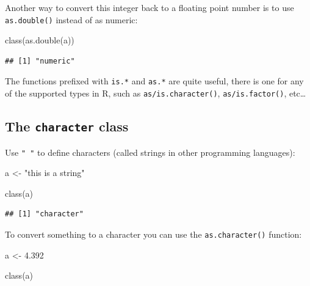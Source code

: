 \documentclass[
]{article}
\newenvironment{Shaded}{\begin{snugshade}}{\end{snugshade}}
\newcommand{\FloatTok}[1]{\textcolor[rgb]{0.00,0.00,0.81}{#1}}
\newcommand{\FunctionTok}[1]{\textcolor[rgb]{0.00,0.00,0.00}{#1}}
\newcommand{\NormalTok}[1]{#1}
\newcommand{\OtherTok}[1]{\textcolor[rgb]{0.56,0.35,0.01}{#1}}
\newcommand{\StringTok}[1]{\textcolor[rgb]{0.31,0.60,0.02}{#1}}
\begin{document}
Another way to convert this integer back to a floating point number is to use \texttt{as.double()} instead of
as numeric:

\begin{Shaded}
\begin{Highlighting}[]
\FunctionTok{class}\NormalTok{(}\FunctionTok{as.double}\NormalTok{(a))}
\end{Highlighting}
\end{Shaded}

\begin{verbatim}
## [1] "numeric"
\end{verbatim}

The functions prefixed with \texttt{is.*} and \texttt{as.*} are quite useful, there is one for any of the supported types in R, such
as \texttt{as/is.character()}, \texttt{as/is.factor()}, etc\ldots{}

\hypertarget{the-character-class}{%
\subsection{\texorpdfstring{The \texttt{character} class}{The character class}}\label{the-character-class}}

Use \texttt{"\ "} to define characters (called strings in other programming languages):

\begin{Shaded}
\begin{Highlighting}[]
\NormalTok{a }\OtherTok{\textless{}{-}} \StringTok{"this is a string"}
\end{Highlighting}
\end{Shaded}

\begin{Shaded}
\begin{Highlighting}[]
\FunctionTok{class}\NormalTok{(a)}
\end{Highlighting}
\end{Shaded}

\begin{verbatim}
## [1] "character"
\end{verbatim}

To convert something to a character you can use the \texttt{as.character()} function:

\begin{Shaded}
\begin{Highlighting}[]
\NormalTok{a }\OtherTok{\textless{}{-}} \FloatTok{4.392}

\FunctionTok{class}\NormalTok{(a)}
\end{Highlighting}
\end{Shaded}
\end{document}

